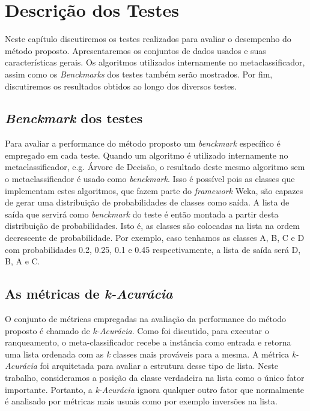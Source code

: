 \chapter{Descrição dos Testes}

Neste capítulo discutiremos os testes realizados para avaliar o desempenho do método proposto.
Apresentaremos os conjuntos de dados usados e suas características gerais. 
Os algoritmos utilizados internamente no metaclassificador, assim como os \textit{Benckmarks} dos testes também serão mostrados.
Por fim, discutiremos os resultados obtidos ao longo dos diversos testes.

\section{\textit{Benckmark} dos testes}

Para avaliar a performance do método proposto um \textit{benckmark} específico é empregado em cada teste.
Quando um algoritmo é utilizado internamente no metaclassificador, e.g. Árvore de Decisão, o resultado deste mesmo algoritmo sem o metaclassificador é usado como \textit{benckmark}.
Isso é possível pois as classes que implementam estes algoritmos, que fazem parte do \textit{framework} Weka, são capazes de gerar uma distribuição de probabilidades de classes como saída.
A lista de saída que servirá como \textit{benckmark} do teste é então montada a partir desta distribuição de probabilidades.
Isto é, as classes são colocadas na lista na ordem decrescente de probabilidade.
Por exemplo, caso tenhamos as classes A, B, C e D com probabilidades 0.2, 0.25, 0.1 e 0.45 respectivamente, a lista de saída será D, B, A e C.

\section{As métricas de \textit{k-Acurácia}}

O conjunto de métricas empregadas na avaliação da performance do método proposto é chamado de \textit{k-Acurácia}. 
Como foi discutido, para executar o ranqueamento, o meta-classificador recebe a instância como entrada e retorna uma lista ordenada com as \textit{k} classes mais prováveis para a mesma.
A métrica \textit{k-Acurácia} foi arquitetada para avaliar a estrutura desse tipo de lista.
Neste trabalho, consideramos a posição da classe verdadeira na lista como o único fator importante.
Portanto, a \textit{k-Acurácia} ignora qualquer outro fator que normalmente é analisado por métricas mais usuais como por exemplo inversões na lista.

